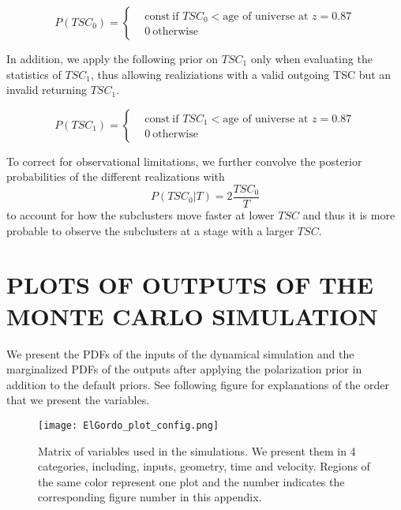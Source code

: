 \begin{equation}
	P(TSC_0) = 
	\begin{cases}
		& \text{const}~\text{if }TSC_0 < \text{age of universe at } z=0.87	\\
		& 0~\text{otherwise}
	\end{cases}
\end{equation}

In addition, we apply the following prior on $TSC_1$ only when evaluating the
statistics of $TSC_1$, thus allowing realiziations with a valid
outgoing TSC but an invalid returning $TSC_1$. 

\begin{equation}
	P(TSC_1) = 
	\begin{cases}
		& \text{const}~\text{if }TSC_1 < \text{age of universe at } z=0.87	\\
		& 0~\text{otherwise} \label{eqn:TSM_1}
	\end{cases}
\end{equation}

To correct for observational limitations, we further convolve the
posterior probabilities of the different realizations with 
\begin{equation}
	P(TSC_0 | T) = 2 \frac{TSC_0}{T}
\end{equation}
to account for how the subclusters move faster at lower $TSC$ and thus it
is more probable to observe the subclusters at a stage with a larger $TSC$.

\par 

%

\section{PLOTS OF OUTPUTS OF THE MONTE CARLO SIMULATION}
%

We present the PDFs of the inputs of the dynamical simulation and the
marginalized PDFs of the outputs after applying the polarization prior in
addition to the default priors. See following figure for explanations of
the order that we present the variables. 
\begin{figure}
	\begin{center}
	\texttt{[image: ElGordo\_plot\_config.png]}
	\end{center}
	\caption{Matrix of variables used in the simulations. We present them in
	4 categories, including, inputs, geometry, time and velocity. Regions of
	the same color represent one plot and the number
indicates the corresponding figure number in this appendix.}
\end{figure}



